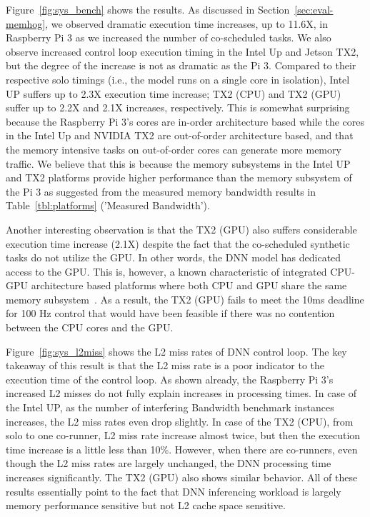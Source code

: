 Figure~\ref{fig:sys_bench} shows the results. As discussed in 
Section~\ref{sec:eval-memhog}, we observed dramatic execution time
increases, up to 11.6X, in Raspberry Pi 3 as we increased the number of
co-scheduled tasks. We also observe increased control loop execution
timing in the Intel Up and Jetson TX2, but the degree of the increase is 
not as dramatic as the Pi 3. Compared to their respective solo timings 
(i.e., the model runs on a single core in isolation), Intel UP suffers up to
2.3X execution time increase; TX2 (CPU) and TX2 (GPU) suffer up to
2.2X and 2.1X increases, respectively. This is somewhat surprising
because the Raspberry Pi 3's cores are in-order architecture based while
the cores in the Intel Up and NVIDIA TX2 are out-of-order architecture
based, and that the memory intensive tasks on out-of-order cores can
generate more memory traffic. We believe that this is because the
memory subsystems in the Intel UP and TX2 platforms provide higher
performance than the memory subsystem of the Pi 3 as suggested from
the measured memory bandwidth results in Table~\ref{tbl:platforms}
('Measured Bandwidth').

Another interesting observation is that the TX2 (GPU) also suffers
considerable execution time increase (2.1X) despite the fact that the
co-scheduled synthetic tasks do not utilize the GPU. In other words,
the DNN model has dedicated access to the GPU. This is, however, a
known characteristic of integrated CPU-GPU architecture based
platforms where both CPU and GPU share the same memory
subsystem~\cite{Ali2017}. As a result, the TX2 (GPU) fails to meet the
10ms deadline for 100 Hz control that would have been feasible if
there was no contention between the CPU cores and the GPU.

Figure~\ref{fig:sys_l2miss} shows the L2 miss rates of DNN control
loop. The key takeaway of this result is that the L2 miss rate is a
poor indicator to the execution time of the control loop. As shown
already, the Raspberry Pi 3's increased L2 misses do not fully explain
increases in processing times. In case of the Intel UP, as the number of
interfering Bandwidth benchmark instances increases, the L2 miss rates
even drop slightly. In case of the TX2 (CPU), from solo to one co-runner,
L2 miss rate increase almost twice, but then the execution time
increase is a little less than 10\%. However, when there are
co-runners, even though the L2 miss rates are largely unchanged, the
DNN processing time increases significantly. The TX2 (GPU) also shows
similar behavior. All of these results essentially point to the fact
that DNN inferencing workload is largely memory performance sensitive
but not L2 cache space sensitive. 

